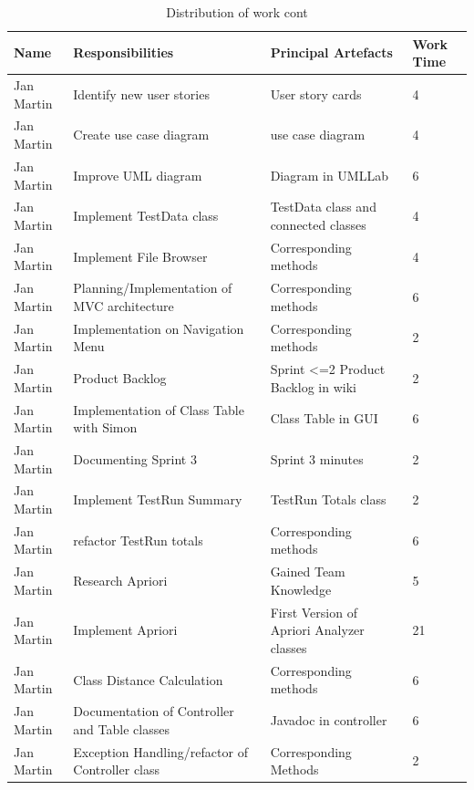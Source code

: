 \newpage
\begin{table}[!h]
  \caption{Distribution of work cont}
  \centering
  \begin{tabular}{p{2cm}||p{4.2cm}|p{4cm}|l|}
    Name & Responsibilities & Principal Artefacts & Work Time\\
    \hline
    \hline
    Jan Martin & Identify new user stories & User story cards & 4 \\
    \hline
    Jan Martin & Create use case diagram & use case diagram & 4 \\ 
    \hline
    Jan Martin & Improve UML diagram & Diagram in UMLLab & 6 \\ 
    \hline  
    Jan Martin & Implement TestData class & TestData class and connected classes & 4 \\ 
    \hline  
    Jan Martin & Implement File Browser & Corresponding methods & 4 \\ 
    \hline
    Jan Martin & Planning/Implementation of MVC architecture & Corresponding methods & 6 \\ 
    \hline  
    Jan Martin & Implementation on Navigation Menu & Corresponding methods & 2 \\ 
    \hline  
    Jan Martin & Product Backlog & Sprint <=2 Product Backlog in wiki & 2 \\ 
    \hline  
    Jan Martin & Implementation of Class Table with Simon & Class Table in GUI & 6 \\ 
    \hline  
    Jan Martin & Documenting Sprint 3 & Sprint 3 minutes & 2 \\ 
    \hline 
    Jan Martin & Implement TestRun Summary & TestRun Totals class & 2 \\ 
    \hline  
    Jan Martin & refactor TestRun totals & Corresponding methods & 6 \\ 
    \hline  
    Jan Martin & Research Apriori & Gained Team Knowledge & 5 \\ 
    \hline  
    Jan Martin & Implement Apriori & First Version of Apriori Analyzer classes & 21 \\ 
    \hline  
    Jan Martin & Class Distance Calculation & Corresponding methods & 6 \\ 
    \hline  
    Jan Martin & Documentation of Controller and Table classes & Javadoc in controller & 6 \\ 
    \hline    
    Jan Martin & Exception Handling/refactor of Controller class & Corresponding Methods & 2 \\ 
    \hline  
    \hline
  \end{tabular}
\end{table}    
